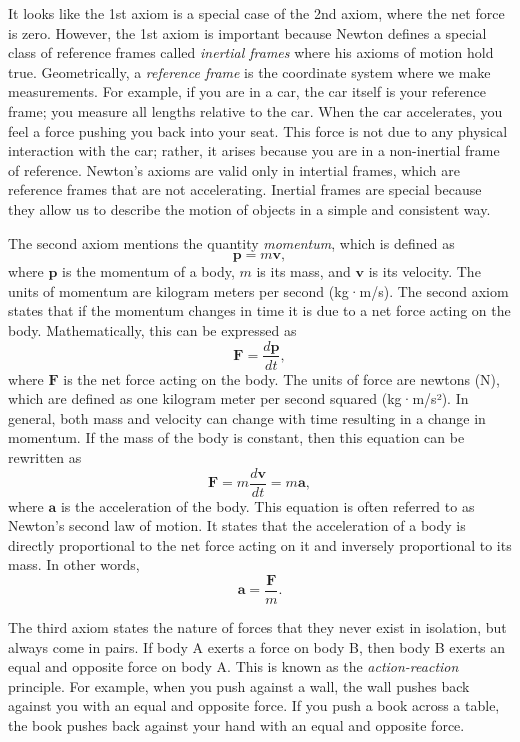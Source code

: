 \documentclass[12pt]{article}
\begin{document}
It looks like the 1st axiom is a special case of the 2nd axiom, where the net force is zero. However, the 1st axiom is important because Newton defines a special class of reference frames called \emph{inertial frames} where his axioms of motion hold true. Geometrically, a \emph{reference frame} is the coordinate system where we make measurements. For example, if you are in a car, the car itself is your reference frame; you measure all lengths relative to the car. When the car accelerates, you feel a force pushing you back into your seat. This force is not due to any physical interaction with the car; rather, it arises because you are in a non-inertial frame of reference. Newton's axioms are valid only in intertial frames, which are reference frames that are not accelerating. Inertial frames are special because they allow us to describe the motion of objects in a simple and consistent way.

The second axiom mentions the quantity \emph{momentum}, which is defined as
\begin{equation}
    \mathbf{p} = m\mathbf{v},
\end{equation}
where $\mathbf{p}$ is the momentum of a body, $m$ is its mass, and $\mathbf{v}$ is its velocity. The units of momentum are kilogram meters per second (kg·m/s). The second axiom states that if the momentum changes in time it is due to a net force acting on the body. Mathematically, this can be expressed as
\begin{equation}
    \mathbf{F} = \frac{d\mathbf{p}}{dt},
\end{equation}
where $\mathbf{F}$ is the net force acting on the body. The units of force are newtons (N), which are defined as one kilogram meter per second squared (kg·m/s²). In general, both mass and velocity can change with time resulting in a change in momentum. If the mass of the body is constant, then this equation can be rewritten as
\begin{equation}
    \mathbf{F} = m\frac{d\mathbf{v}}{dt} = m\mathbf{a},
\end{equation}
where $\mathbf{a}$ is the acceleration of the body. This equation is often referred to as Newton's second law of motion. It states that the acceleration of a body is directly proportional to the net force acting on it and inversely proportional to its mass. In other words,
\begin{equation}
    \mathbf{a} = \frac{\mathbf{F}}{m}.
\end{equation}

The third axiom states the nature of forces that they never exist in isolation, but always come in pairs. If body A exerts a force on body B, then body B exerts an equal and opposite force on body A. This is known as the \emph{action-reaction} principle. For example, when you push against a wall, the wall pushes back against you with an equal and opposite force. If you push a book across a table, the book pushes back against your hand with an equal and opposite force.
\end{document}

